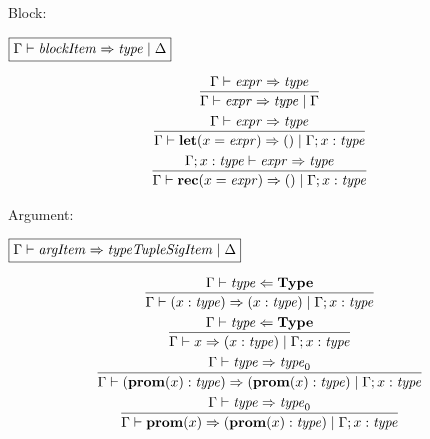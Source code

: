 Block:

$\fbox{$\Gamma \vdash \mathit{blockItem} \Rightarrow \mathit{type} \mid \Delta$}$

\begin{gather*}
  \infer{\Gamma \vdash \mathit{expr} \Rightarrow \mathit{type} \mid \Gamma}{
    \Gamma \vdash \mathit{expr} \Rightarrow \mathit{type}
  }
  \\
  \infer{\Gamma \vdash \mathbf{let}(x = \mathit{expr}) \Rightarrow () \mid \Gamma; x: \mathit{type}}{
    \Gamma \vdash \mathit{expr} \Rightarrow \mathit{type}
  }
  \\
  \infer{\Gamma \vdash \mathbf{rec}(x = \mathit{expr}) \Rightarrow () \mid \Gamma; x: \mathit{type}}{
    \Gamma; x: \mathit{type} \vdash \mathit{expr} \Rightarrow \mathit{type}
  }
\end{gather*}

Argument:

$\fbox{$\Gamma \vdash \mathit{argItem} \Rightarrow \mathit{typeTupleSigItem} \mid \Delta$}$

\begin{gather*}
  \infer{\Gamma \vdash (x: \mathit{type}) \Rightarrow (x: \mathit{type}) \mid \Gamma; x: \mathit{type}}{
    \Gamma \vdash \mathit{type} \Leftarrow \mathbf{Type}
  }
  \\
  \infer{\Gamma \vdash x \Rightarrow (x: \mathit{type}) \mid \Gamma; x: \mathit{type}}{
    \Gamma \vdash \mathit{type} \Leftarrow \mathbf{Type}
  }
  \\
  \infer{\Gamma \vdash (\mathbf{prom}(x): \mathit{type}) \Rightarrow (\mathbf{prom}(x): \mathit{type}) \mid \Gamma; x: \mathit{type}}{
    \Gamma \vdash \mathit{type} \Rightarrow \mathit{type}_0
  }
  \\
  \infer{\Gamma \vdash \mathbf{prom}(x) \Rightarrow (\mathbf{prom}(x): \mathit{type}) \mid \Gamma; x: \mathit{type}}{
    \Gamma \vdash \mathit{type} \Rightarrow \mathit{type}_0
  }
\end{gather*}
